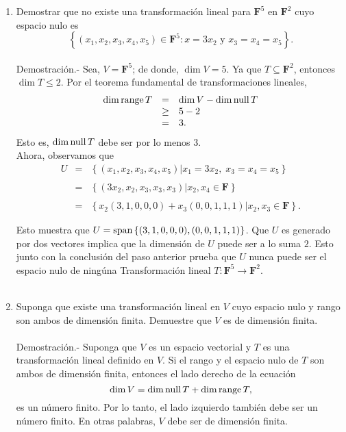 \begin{enumerate}[\bfseries 1.]
    \item Demostrar que no existe una transformación lineal para $\textbf{F}^5$ en $\textbf{F}^2$ cuyo espacio nulo es
    $$\left\{(x_1,x_2,x_3,x_4,x_5)\in \textbf{F}^5 : x=3x_2 \mbox{ y } x_3=x_4=x_5\right\}.$$\\
	Demostración.-\; Sea, $V=\textbf{F}^5$; de donde, $\dim V = 5$. Ya que $T\subseteq \textbf{F}^2$, entonces $\dim T \leq 2$. Por el teorema fundamental de transformaciones lineales,
	$$
	\begin{array}{rcl}
	    \dim \operatorname{range} T &=& \dim V - \dim \operatorname{null} T\\
			  &\geq& 5-2\\
			  &=& 3.
	\end{array}
	$$
	Esto es, $\dim \operatorname{null} T$ debe ser por lo menos $3$.\\
	Ahora, observamos que
	$$
	\begin{array}{rcl}
	    U &=& \left\{(x_1,x_2,x_3,x_4,x_5) | x_1=3x_2,\; x_3=x_4=x_5\right\}\\\\
	      &=& \left\{(3x_2,x_2,x_3,x_3,x_3) | x_2,x_4\in \textbf{F}\right\}\\\\
	      &=& \left\{x_2(3,1,0,0,0)+x_3(0,0,1,1,1) | x_2,x_3\in \textbf{F}\right\}.
	\end{array}
	$$

	Esto muestra que $U=\mathop{\mbox{\normalfont span}}\nolimits \left\{(3,1,0,0,0),(0,0,1,1,1)\right\}$. Que $U$ es generado por dos vectores implica que la dimensión de $U$ puede ser a lo suma $2$. Esto junto con la conclusión del paso anterior prueba que $U$ nunca puede ser el espacio nulo de ningúna Transformación lineal $T:\textbf{F}^5\to \textbf{F}^2$.\\\\


    \item Suponga que existe una transformación lineal en $V$ cuyo espacio nulo y rango son ambos de dimensión finita. Demuestre que $V$ es de dimensión finita.\\\\
	Demostración.-\; Suponga que $V$ es un espacio vectorial y $T$ es una transformación lineal definido en $V$. Si el rango y el espacio nulo de $T$ son ambos de dimensión finita, entonces el lado derecho de la ecuación 
	$$\dim V = \dim \operatorname{null} T + \dim \operatorname{range} T,$$
	es un número finito. Por lo tanto, el lado izquierdo también debe ser un número finito. En otras palabras, $V$ debe ser de dimensión finita.\\\\


\end{enumerate}
